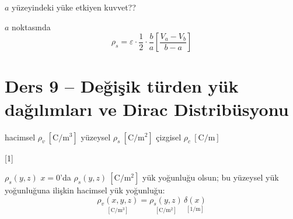 \documentclass[11pt,a4paper]{article}
\begin{document}
\textcolor{kirmizikalem}{$a$ yüzeyindeki yüke etkiyen kuvvet??}

 \qquad {}



$a$ noktasında
\[ \rho_s=\varepsilon\cdot\frac12\cdot\frac{b}{a}\left[\frac{V_a-V_b}{b-a}\right] \]

\section{Ders 9 -- Değişik türden yük dağılımları ve Dirac Distribüsyonu}

\noindent hacimsel $\rho_v\ [\mathrm{C/m^3}]$ \hfill yüzeysel $\rho_s\ [\mathrm{C/m^2}]$ \hfill çizgisel $\rho_c\ [\mathrm{C/m}]$

[1]

$\rho_s(y,z)$ \quad $x=0$'da $\rho_s(y,z)\ [\mathrm{C/m^2}]$ yük yoğunluğu olsun; bu yüzeysel yük yoğunluğuna ilişkin hacimsel yük yoğunluğu:
\[ \underset{[\mathrm{C/m^3}]}{\rho_v(x,y,z)}=\underset{[\mathrm{C/m^2}]}{\rho_s(y,z)}\,\underset{[1/\mathrm{m}]}{\delta(x)} \]
\end{document}
